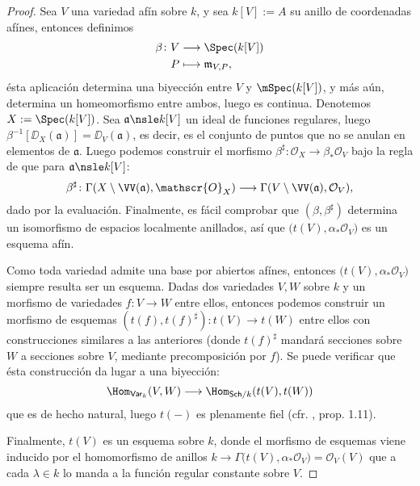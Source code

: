 \begin{proof}
	Sea $V$ una variedad afín sobre $k$, y sea $k[V ] := A$ su anillo de coordenadas afínes, entonces definimos
	\begin{align*}
		\beta \colon V &\longrightarrow \Spec(k[V]) \\
		P &\longmapsto \mathfrak{m}_{V, P},
	\end{align*}
	ésta aplicación determina una biyección entre $V$ y $\mSpec( k[V] )$, y más aún, determina un homeomorfismo entre ambos, luego es continua.
	Denotemos $X := \Spec( k[V] )$.
	Sea $\mathfrak{a} \nsle k[V ]$ un ideal de funciones regulares, luego $\beta^{-1}[\DD_X(\mathfrak{a})] = \DD_V(\mathfrak{a})$, es decir,
	es el conjunto de puntos que no se anulan en elementos de $\mathfrak{a}$.
	Luego podemos construir el morfismo $\beta^\sharp \colon \mathscr{O}_X \to \beta_*\mathcal{O}_V$ bajo
	la regla de que para $\mathfrak{a} \nsle k[V ]$:
	$$ \beta^\sharp \colon \Gamma(X \setminus \VV(\mathfrak{a}), \mathscr{O}_X ) \longrightarrow \Gamma(V \setminus \VV(\mathfrak{a}), \mathcal{O}_V ), $$
	dado por la evaluación. Finalmente, es fácil comprobar que $(\beta, \beta^\sharp)$ determina un isomorfismo de espacios localmente anillados,
	así que $\big( t(V), \alpha_*\mathcal{O}_V \big)$ es un esquema afín.

	Como toda variedad admite una base por abiertos afínes, entonces $\big(t(V ), \alpha_*\mathcal{O}_V \big)$ siempre resulta ser un esquema.
	Dadas dos variedades $V, W$ sobre $k$ y un morfismo de variedades $f \colon V \to W$ entre ellos, entonces podemos construir un
	morfismo de esquemas $(t(f ), t(f )^\sharp ) \colon t(V ) \to t(W )$ entre ellos con construcciones similares a las anteriores
	(donde $t(f)^\sharp$ mandará secciones sobre $W$ a secciones sobre $V$, mediante precomposición por $f$).
	Se puede verificar que ésta construcción da lugar a una biyección:
	$$ \Hom_{\mathsf{Var}_k}(V, W ) \longrightarrow \Hom_{\mathsf{Sch}/k}(t(V), t(W )) $$
	que es de hecho natural, luego $t(-)$ es plenamente fiel (cfr. \cite{CatTh}, prop. 1.11).
	
	Finalmente, $t(V)$ es un esquema sobre $k$, donde el morfismo de esquemas viene inducido por el homomorfismo de anillos
	$k \to \Gamma\big( t(V), \alpha_* \mathcal{O}_V \big) = \mathcal{O}_V(V)$
	que a cada $\lambda \in k$ lo manda a la función regular constante sobre $V$.
\end{proof}

